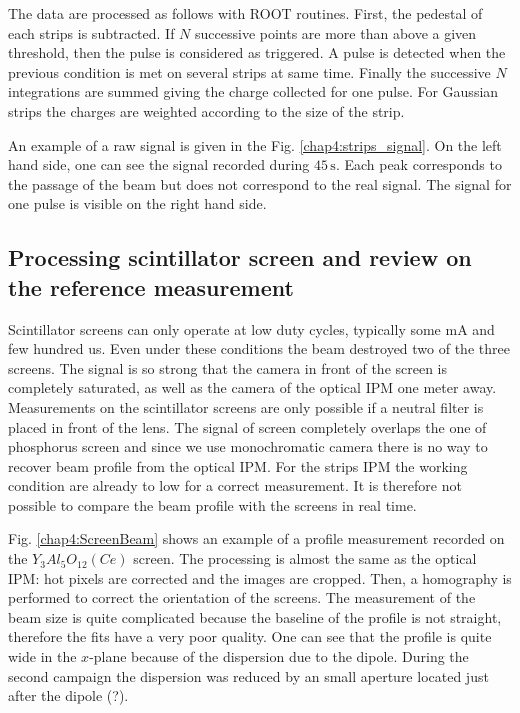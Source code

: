 \begin{refsection}
  The data are processed as follows with ROOT\cite{Brun1997,Antcheva2009} routines. First, the pedestal of each strips is subtracted. If $N$ successive points are more than above a given threshold, then the pulse is considered as triggered. A pulse is detected when the previous condition is met on several strips at same time. Finally the successive $N$ integrations are summed giving the charge collected for one pulse. For Gaussian strips the charges are weighted according to the size of the strip.

  An example of a raw signal is given in the Fig. \ref{chap4:strips_signal}. On the left hand side, one can see the signal recorded during $45\,\mathrm{s}$. Each peak corresponds to the passage of the beam but does not correspond to the real signal. The signal for one pulse is visible on the right hand side.

  


  \subsection{Processing scintillator screen and review on the reference measurement}
  Scintillator screens can only operate at low duty cycles, typically some mA and few hundred us. Even under these conditions the beam destroyed two of the three screens. The signal is so strong that the camera in front of the screen is completely saturated, as well as the camera of the optical IPM one meter away. Measurements on the scintillator screens are only possible if a neutral filter is placed in front of the lens. The signal of screen completely overlaps the one of phosphorus screen and since we use monochromatic camera there is no way to recover beam profile from the optical IPM. For the strips IPM the working condition are already to low for a correct measurement. It is therefore not possible to compare the beam profile with the screens in real time.
  

  Fig. \ref{chap4:ScreenBeam} shows an example of a profile measurement recorded on the $Y_{3}Al_{5}O_{12}(Ce)$ screen. The processing is almost the same as the optical IPM: hot pixels are corrected and the images are cropped. Then, a homography is performed to correct the orientation of the screens. The measurement of the beam size is quite complicated because the baseline of the profile is not straight, therefore the fits have a very poor quality. One can see that the profile is quite wide in the $x$-plane because of the dispersion due to the dipole. During the second campaign the dispersion was reduced by an small aperture located just after the dipole (?).


\end{refsection}
